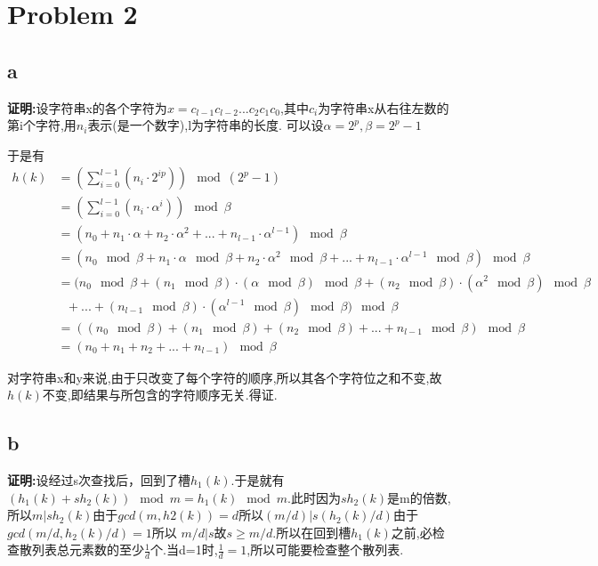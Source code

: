 \documentclass[12pt,a4paper,fontset=none]{ctexart}
\begin{document}
\section{Problem 2}
\subsection{a}
\textbf{证明:}设字符串x的各个字符为$x=c_{l-1}c_{l-2}...c_2c_1c_0$,其中$c_i$为字符串x从右往左数的第i个字符,用$n_i$表示(是一个数字),l为字符串的长度.
可以设$\alpha =2^p,\beta=2^p-1$

于是有
\begin{align*}
    h(k) & =(\sum_{i=0}^{l-1}(n_i\cdot 2^{ip}))\mod (2^p-1)                                                                             \\
         & =(\sum_{i=0}^{l-1}(n_i\cdot \alpha^i))\mod \beta                                                                             \\
         & =(n_0+n_1\cdot \alpha +n_2\cdot \alpha^2+...+n_{l-1}\cdot \alpha^{l-1})\mod \beta                                            \\
         & =(n_0\mod \beta+n_1\cdot \alpha \mod \beta+n_2\cdot \alpha^2 \mod \beta+...+n_{l-1}\cdot \alpha^{l-1} \mod \beta )\mod \beta \\
         & =(n_0\mod \beta+(n_1 \mod \beta) \cdot (\alpha \mod \beta) \mod \beta+(n_2\mod \beta) \cdot (\alpha^2 \mod \beta)\mod \beta  \\ &\text{  }+... +(n_{l-1}\mod \beta)\cdot (\alpha^{l-1} \mod \beta)\mod \beta )\mod \beta \\
         & =((n_0\mod \beta)+(n_1\mod \beta)+(n_2\mod \beta)+...+n_{l-1}\mod \beta)\mod \beta                                           \\
         & =(n_0+n_1+n_2+...+n_{l-1})\mod \beta
\end{align*}

对字符串x和y来说,由于只改变了每个字符的顺序,所以其各个字符位之和不变,故$h(k)$不变,即结果与所包含的字符顺序无关.得证.
\subsection{b}
\textbf{证明:}设经过s次查找后，回到了槽$h_1(k)$.于是就有$(h_1(k)+sh_2(k))\mod m=h_1(k)\mod m.$此时因为$sh_2(k)$是m的倍数,所以$m|sh_2(k) $由于$gcd(m,h2(k))=d $所以$ (m/d) | s(h_2(k)/d) $由于$gcd(m/d,h_2(k)/d)=1 $所以 $m/d | s$故$s\geq m/d$.所以在回到槽$h_1(k)$之前,必检查散列表总元素数的至少$\frac{1}{d} $个.当d=1时,$\frac{1}{d} =1$,所以可能要检查整个散列表.
\end{document}
